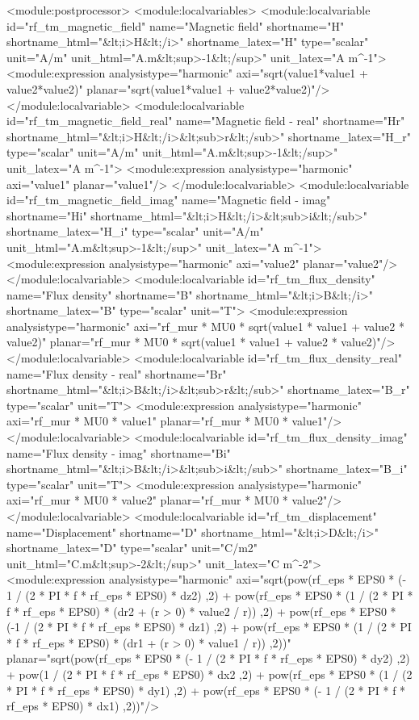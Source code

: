 \documentclass[12pt,a4paper,oneside]{article}
\numberwithin{equation}{section} %
\numberwithin{figure}{section} %
\numberwithin{table}{section} %
\begin{document}
\small\begin{spverbatim}
  <module:postprocessor>
    <module:localvariables>
    <module:localvariable id="rf_tm_magnetic_field" name="Magnetic field" shortname="H" shortname_html="&lt;i>H&lt;/i>" shortname_latex="H" type="scalar" unit="A/m" unit_html="A.m&lt;sup>-1&lt;/sup>" unit_latex="A \cdot m^{-1}">
      <module:expression analysistype="harmonic" axi="sqrt(value1*value1 + value2*value2)" planar="sqrt(value1*value1 + value2*value2)"/>
    </module:localvariable>
    <module:localvariable id="rf_tm_magnetic_field_real" name="Magnetic field - real" shortname="Hr" shortname_html="&lt;i>H&lt;/i>&lt;sub>r&lt;/sub>" shortname_latex="H_{r}" type="scalar" unit="A/m" unit_html="A.m&lt;sup>-1&lt;/sup>" unit_latex="A \cdot m^{-1}">
      <module:expression analysistype="harmonic" axi="value1" planar="value1"/>
    </module:localvariable>
    <module:localvariable id="rf_tm_magnetic_field_imag" name="Magnetic field - imag" shortname="Hi" shortname_html="&lt;i>H&lt;/i>&lt;sub>i&lt;/sub>" shortname_latex="H_{i}" type="scalar" unit="A/m" unit_html="A.m&lt;sup>-1&lt;/sup>" unit_latex="A \cdot m^{-1}">
      <module:expression analysistype="harmonic" axi="value2" planar="value2"/>
    </module:localvariable>
    <module:localvariable id="rf_tm_flux_density" name="Flux density" shortname="B" shortname_html="&lt;i>B&lt;/i>" shortname_latex="B" type="scalar" unit="T">
      <module:expression analysistype="harmonic" axi="rf_mur * MU0 * sqrt(value1 * value1 + value2 * value2)" planar="rf_mur * MU0 * sqrt(value1 * value1 + value2 * value2)"/>
    </module:localvariable>
    <module:localvariable id="rf_tm_flux_density_real" name="Flux density - real" shortname="Br" shortname_html="&lt;i>B&lt;/i>&lt;sub>r&lt;/sub>" shortname_latex="B_{r}" type="scalar" unit="T">
      <module:expression analysistype="harmonic" axi="rf_mur * MU0 * value1" planar="rf_mur * MU0 * value1"/>
    </module:localvariable>
    <module:localvariable id="rf_tm_flux_density_imag" name="Flux density - imag" shortname="Bi" shortname_html="&lt;i>B&lt;/i>&lt;sub>i&lt;/sub>" shortname_latex="B_{i}" type="scalar" unit="T">
      <module:expression analysistype="harmonic" axi="rf_mur * MU0 * value2" planar="rf_mur * MU0 * value2"/>
    </module:localvariable>
    <module:localvariable id="rf_tm_displacement" name="Displacement" shortname="D" shortname_html="&lt;i>D&lt;/i>" shortname_latex="D" type="scalar" unit="C/m2" unit_html="C.m&lt;sup>-2&lt;/sup>" unit_latex="C \cdot m^{-2}">
      <module:expression analysistype="harmonic" axi="sqrt(pow(rf_eps * EPS0 * (- 1 / (2 * PI * f * rf_eps * EPS0) * dz2) ,2) + pow(rf_eps * EPS0 * (1 / (2 * PI * f * rf_eps * EPS0) * (dr2 + (r > 0) * value2 / r)) ,2) + pow(rf_eps * EPS0 * (-1 / (2 * PI * f * rf_eps * EPS0) * dz1) ,2) + pow(rf_eps * EPS0 * (1 / (2 * PI * f * rf_eps * EPS0) * (dr1 + (r > 0) * value1 / r)) ,2))" planar="sqrt(pow(rf_eps * EPS0 * (- 1 / (2 * PI * f * rf_eps * EPS0) * dy2) ,2) + pow(1 / (2 * PI * f * rf_eps * EPS0) * dx2 ,2) + pow(rf_eps * EPS0 * (1 / (2 * PI * f * rf_eps * EPS0) * dy1) ,2) + pow(rf_eps * EPS0 * (- 1 / (2 * PI * f * rf_eps * EPS0) * dx1) ,2))"/>

\end{spverbatim}
\end{document}

